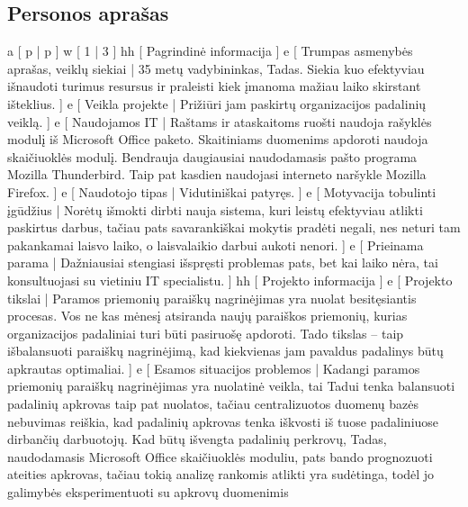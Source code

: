 \subsection{Personos aprašas}
\xtableu
{
  a [ p | p ]
  w [ 1 | 3 ]
  hh [ Pagrindinė informacija ]
  e [ Trumpas asmenybės aprašas, veiklų siekiai 
  | 
    35 metų vadybininkas, Tadas. Siekia kuo efektyviau išnaudoti turimus resursus ir praleisti
    kiek įmanoma mažiau laiko skirstant išteklius.
  ]
  e [ Veikla projekte 
  | 
    Prižiūri jam paskirtų organizacijos padalinių veiklą.
  ]
  e [ Naudojamos IT 
  | 
    Raštams ir ataskaitoms ruošti naudoja rašyklės modulį iš Microsoft Office paketo. Skaitiniams
    duomenims apdoroti naudoja skaičiuoklės modulį. Bendrauja daugiausiai naudodamasis pašto
    programa Mozilla Thunderbird. Taip pat kasdien naudojasi interneto naršykle Mozilla Firefox.
  ]
  e [ Naudotojo tipas 
  | 
    Vidutiniškai patyręs. 
  ]
  e [ Motyvacija tobulinti įgūdžius 
  |
    Norėtų išmokti dirbti nauja sistema, kuri leistų efektyviau atlikti paskirtus darbus, tačiau
    pats savarankiškai mokytis pradėti negali, nes neturi tam pakankamai laisvo laiko, o
    laisvalaikio darbui aukoti nenori.
  ]
  e [ Prieinama parama 
  | 
    Dažniausiai stengiasi išspręsti problemas pats, bet kai laiko nėra, tai konsultuojasi
    su vietiniu IT specialistu.
  ]
  hh [ Projekto informacija ]
  e [ Projekto tikslai 
  | 
    Paramos priemonių paraiškų nagrinėjimas yra nuolat besitęsiantis procesas. Vos ne
    kas mėnesį atsiranda naujų paraiškos priemonių, kurias organizacijos padaliniai turi būti
    pasiruošę apdoroti. Tado tikslas – taip išbalansuoti paraiškų nagrinėjimą, kad kiekvienas
    jam pavaldus padalinys būtų apkrautas optimaliai.
  ]
  e [ Esamos situacijos problemos 
  | 
    Kadangi paramos priemonių paraiškų nagrinėjimas yra nuolatinė veikla, tai Tadui tenka 
    balansuoti padalinių apkrovas taip pat nuolatos, tačiau centralizuotos duomenų bazės
    nebuvimas reiškia, kad padalinių apkrovas tenka iškvosti iš tuose padaliniuose dirbančių
    darbuotojų. Kad būtų išvengta padalinių perkrovų, Tadas, naudodamasis Microsoft Office
    skaičiuoklės moduliu, pats bando prognozuoti ateities apkrovas, tačiau tokią analizę 
    rankomis atlikti yra sudėtinga, todėl jo galimybės eksperimentuoti su apkrovų duomenimis
}
